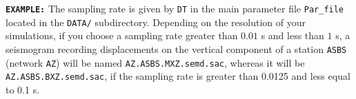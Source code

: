 \noindent \texttt{\textbf{EXAMPLE:}} The sampling rate is given by
\texttt{DT} in the main parameter file \texttt{Par\_file} located
in the \texttt{DATA/} subdirectory. Depending on the resolution of
your simulations, if you choose a sampling rate greater than $0.01$
s and less than $1$ s, a seismogram recording displacements on the
vertical component of a station \texttt{ASBS} (network \texttt{AZ})
will be named \texttt{AZ.ASBS.MXZ.semd.sac}, whereas it will be \texttt{AZ.ASBS.BXZ.semd.sac},
if the sampling rate is greater than 0.0125 and less equal to 0.1
s.


